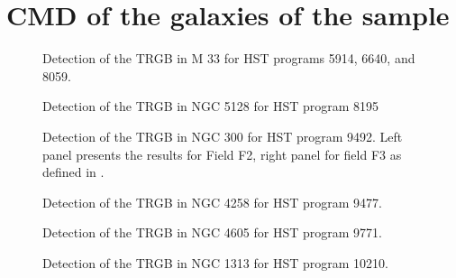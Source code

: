 \documentclass[11pt,preprint2]{aastex}
\begin{document}
\appendix
\section{CMD of the galaxies of the sample}
\label{cmds}
\begin{figure}
\caption{Detection of the TRGB in M 33 for HST programs 5914, 6640, and 8059. \label{m33_1}}
\end{figure}

\begin{figure}
\caption{Detection of the TRGB in NGC 5128 for HST program 8195 \label{ngc5128}}
\end{figure}

\begin{figure}
\caption{Detection of the TRGB in NGC 300 for HST program 9492. Left panel presents the results for Field F2, right panel for field F3 as defined in \citet{Bresolin:rb}. \label{ngc300}}
\end{figure}

\begin{figure}
\caption{Detection of the TRGB in NGC 4258 for HST program 9477.\label{ngc4258}}
\end{figure}

\begin{figure}
\caption{Detection of the TRGB in NGC 4605 for HST program 9771. \label{ngc4605}}
\end{figure}

\begin{figure}
\caption{Detection of the TRGB in NGC 1313 for HST program 10210.\label{ngc1313}}
\end{figure}
\end{document}

